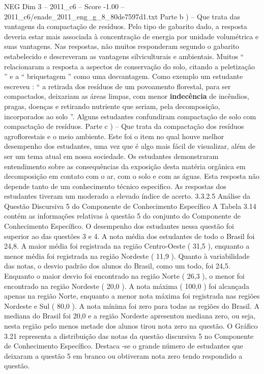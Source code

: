\begin{textsample}{NEG Dim 3 – 2011\_c6 – Score -1.00 – 2011\_c6/enade\_2011\_eng\_g\_8\_80de7597d1.txt}
Parte b ) – Que trata das vantagens da compactação de resíduos.
Pelo tipo de gabarito dado, a resposta deveria estar mais associada à concentração de energia por unidade volumétrica e suas vantagens.
Nas respostas, não muitos responderam segundo o gabarito estabelecido e descreveram as vantagens silviculturais e ambientais.
Muitos “ relacionaram a resposta a aspectos de conservação do solo, citando a peletização ” e a “ briquetagem ” como uma desvantagem.
Como exemplo um estudante escreveu : “ a retirada dos resíduos de um povoamento florestal, para ser compactados, deixariam as áreas limpas, com menor \textbf{indecência} de incêndios, pragas, doenças e retirando nutriente que seriam, pela decomposição, incorporados ao solo ”.
Alguns estudantes confundiram compactação de solo com compactação de resíduos.
Parte c ) – Que trata da compactação dos resíduos agroflorestais e o meio ambiente.
Este foi o item no qual houve melhor desempenho dos estudantes, uma vez que é algo mais fácil de visualizar, além de ser um tema atual em nossa sociedade.
Os estudantes demonstraram entendimento sobre as consequências da exposição desta matéria orgânica em decomposição em contato com o ar, com o solo e com as águas.
Esta resposta não depende tanto de um conhecimento técnico especifico.
As respostas dos estudantes tiveram um moderado a elevado índice de acerto. 3.3.2.5 Análise da Questão Discursiva 5 do Componente de Conhecimento Específico A Tabela 3.14 contém as informações relativas à questão 5 do conjunto do Componente de Conhecimento Específico.
O desempenho dos estudantes nessa questão foi superior ao das questões 3 e 4.
A nota média dos estudantes de todo o Brasil foi 24,8.
A maior média foi registrada na região Centro-Oeste ( 31,5 ), enquanto a menor média foi registrada na região Nordeste ( 11,9 ).
Quanto à variabilidade das notas, o desvio padrão dos alunos do Brasil, como um todo, foi 24,5.
Enquanto o maior desvio foi encontrado na região Norte ( 26,3 ), o menor foi encontrado na região Nordeste ( 20,0 ).
A nota máxima ( 100,0 ) foi alcançada apenas na região Norte, enquanto a menor nota máxima foi registrada nas regiões Nordeste e Sul ( 80,0 ).
A nota mínima foi zero para todas as regiões do Brasil.
A mediana do Brasil foi 20,0 e a região Nordeste apresentou mediana zero, ou seja, nesta região pelo menos metade dos alunos tirou nota zero na questão.
O Gráfico 3.21 representa a distribuição das notas da questão discursiva 5 no Componente de Conhecimento Específico.
Destaca -se o grande número de estudantes que deixaram a questão 5 em branco ou obtiveram nota zero tendo respondido a questão.

\end{textsample}
